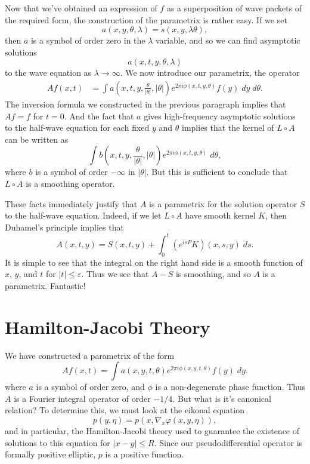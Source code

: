 \documentclass{article}
\theoremstyle{plain}
\theoremstyle{remark}
\theoremstyle{definition}
\begin{document}
Now that we've obtained an expression of $f$ as a superposition of wave packets of the required form, the construction of the parametrix is rather easy. If we set
%
\[ a(x,y,\theta,\lambda) = s( x, y, \lambda \theta ), \]
%
then $a$ is a symbol of order zero in the $\lambda$ variable, and so we can find asymptotic solutions
%
\[ a(x,t,y,\theta,\lambda) \]
%
to the wave equation as $\lambda \to \infty$. We now introduce our parametrix, the operator
%
\begin{align*}
	Af(x,t) &= \int a \left( x, t, y, \frac{\theta}{|\theta|} , |\theta| \right) e^{2 \pi i \phi(x,t,y,\theta)} f(y)\; dy\; d\theta.
\end{align*}
%
The inversion formula we constructed in the previous paragraph implies that $Af = f$ for $t = 0$. And the fact that $a$ gives high-frequency asymptotic solutions to the half-wave equation for each fixed $y$ and $\theta$ implies that the kernel of $L \circ A$ can be written as
%
\[ \int b \left( x, t, y, \frac{\theta}{|\theta|} , |\theta| \right) e^{2 \pi i \phi(x,t,y,\theta)}\; d\theta, \]
%
where $b$ is a symbol of order $-\infty$ in $|\theta|$. But this is sufficient to conclude that $L \circ A$ is a smoothing operator.

These facts immediately justify that $A$ is a parametrix for the solution operator $S$ to the half-wave equation. Indeed, if we let $L \circ A$ have smooth kernel $K$, then Duhamel's principle implies that
%
\[ A(x,t,y) = S(x,t,y) + \int_0^t (e^{isP} K)(x,s,y)\; ds. \]
%
It is simple to see that the integral on the right hand side is a smooth function of $x$, $y$, and $t$ for $|t| \leq \varepsilon$. Thus we see that $A - S$ is smoothing, and so $A$ is a parametrix. Fantastic!

\section{Hamilton-Jacobi Theory}

We have constructed a parametrix of the form
%
\[ Af(x,t) = \int a(x,y,t,\theta) e^{2 \pi i \phi(x,y,t,\theta)} f(y)\; dy. \]
%
where $a$ is a symbol of order zero, and $\phi$ is a non-degenerate phase function. Thus $A$ is a Fourier integral operator of order $-1/4$. But what is it's canonical relation? To determine this, we must look at the eikonal equation
%
\[ p(y,\eta) = p(x, \nabla_x \varphi(x,y,\eta)), \]
%
and in particular, the Hamilton-Jacobi theory used to guarantee the existence of solutions to this equation for $|x - y| \leq R$. Since our pseudodifferential operator is formally positive elliptic, $p$ is a positive function.
\end{document}

